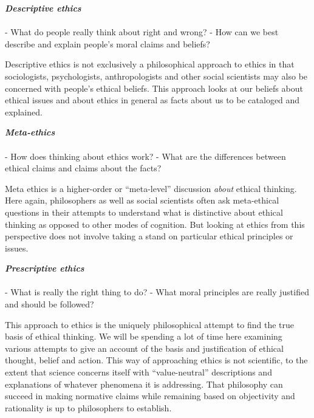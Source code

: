 \documentclass[12pt, openany]{book}
\makeatletter
\newenvironment{kframe}{%
\medskip{}
\setlength{\fboxsep}{.8em}
 \def\at@end@of@kframe{}%
 \ifinner\ifhmode%
  \def\at@end@of@kframe{\end{minipage}}%
  \begin{minipage}{\columnwidth}%
 \fi\fi%
 \def\FrameCommand##1{\hskip\@totalleftmargin \hskip-\fboxsep
 \colorbox{shadecolor}{##1}\hskip-\fboxsep
     \hskip-\linewidth \hskip-\@totalleftmargin \hskip\columnwidth}%
 \MakeFramed {\advance\hsize-\width
   \@totalleftmargin\z@ \linewidth\hsize
   \@setminipage}}%
 {\par\unskip\endMakeFramed%
 \at@end@of@kframe}
\newenvironment{rmdblock}[1]
  {
  \begin{itemize}
  \renewcommand{\labelitemi}{
    \raisebox{-.7\height}[0pt][0pt]{
      {\setkeys{Gin}{width=3em,keepaspectratio}\texttt{[image: img/\#1]}}
    }
  }
  \setlength{\fboxsep}{1em}
  \begin{kframe}
  \item
  }
  {
  \end{kframe}
  \end{itemize}
  }
\newenvironment{rmdquestion}
  {\begin{rmdblock}{question}}
  {\end{rmdblock}}
\makeatother
\begin{document}
\begin{rmdquestion}

\textbf{\emph{Descriptive ethics}}\\
~\\
- What do people really think about right and wrong? - How can we best describe and explain people's moral claims and beliefs?

\end{rmdquestion}

Descriptive ethics is not exclusively a philosophical approach to ethics in that sociologists, psychologists, anthropologists and other social scientists may also be concerned with people's ethical beliefs. This approach looks at our beliefs about ethical issues and about ethics in general as facts about us to be cataloged and explained.

\begin{rmdquestion}

\textbf{\emph{Meta-ethics}}\\
~\\
- How does thinking about ethics work? - What are the differences between ethical claims and claims about the facts?

\end{rmdquestion}

Meta ethics is a higher-order or ``meta-level'' discussion \emph{about} ethical thinking. Here again, philosophers as well as social scientists often ask meta-ethical questions in their attempts to understand what is distinctive about ethical thinking as opposed to other modes of cognition. But looking at ethics from this perspective does not involve taking a stand on particular ethical principles or issues.

\begin{rmdquestion}

\textbf{\emph{Prescriptive ethics}}\\
~\\
- What is really the right thing to do? - What moral principles are really justified and should be followed?

\end{rmdquestion}

This approach to ethics is the uniquely philosophical attempt to find the true basis of ethical thinking. We will be spending a lot of time here examining various attempts to give an account of the basis and justification of ethical thought, belief and action. This way of approaching ethics is not scientific, to the extent that science concerns itself with ``value-neutral'' descriptions and explanations of whatever phenomena it is addressing. That philosophy can succeed in making normative claims while remaining based on objectivity and rationality is up to philosophers to establish.
\end{document}
